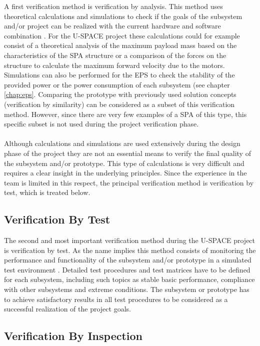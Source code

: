 A first verification method is verification by analysis. This method uses theoretical calculations and simulations to check if the goals of the subsystem and/or project can be realized with the current hardware and software combination \cite{ECSS_verification}. For the \ac{U-SPACE} project these calculations could for example consist of a theoretical analysis of the maximum payload mass based on the characteristics of the \ac{SPA} structure or a comparison of the forces on the structure to calculate the maximum forward velocity due to the motors. Simulations can also be performed for the \ac{EPS} to check the stability of the provided power or the power consumption of each subsystem (see chapter \ref{chap:eps}. Comparing the prototype with previously used solution concepts (verification by similarity) can be considered as a subset of this verification method. However, since there are very few examples of a \ac{SPA} of this type, this specific subset is not used during the project verification phase.
\\
\\
Although calculations and simulations are used extensively during the design phase of the project they are not an essential means to verify the final quality of the subsystem and/or prototype. This type of calculations is very difficult and requires a clear insight in the underlying principles. Since the experience in the team is limited in this respect, the principal verification method is verification by test, which is treated below.

\subsection{Verification By Test}

The second and most important verification method during the \ac{U-SPACE} project is verification by test. As the name implies this method consists of monitoring the performance and functionality of the subsystem and/or prototype in a simulated test environment \cite{ECSS_verification}. Detailed test procedures and test matrices have to be defined for each subsystem, including such topics as stable basic performance, compliance with other subsystems and extreme conditions. The subsystem or prototype has to achieve satisfactory results in all test procedures to be considered as a successful realization of the project goals.

\subsection{Verification By Inspection}

